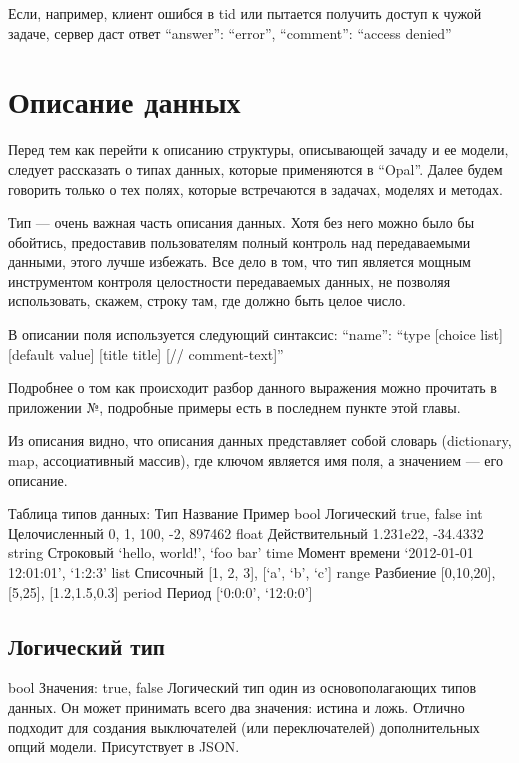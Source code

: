 {{Если, например, клиент ошибся в tid или пытается получить доступ к чужой задаче, сервер даст ответ
        {
                “answer”: “error”,
                “comment”: “access denied”
        }
        
\section{Описание данных}

Перед тем как перейти к описанию структуры, описывающей зачаду и ее модели, следует рассказать о типах данных, которые применяются в “Opal”. Далее будем говорить только о тех полях, которые встречаются в задачах, моделях и методах.

Тип — очень важная часть описания данных. Хотя без него можно было бы обойтись, предоставив пользователям полный контроль над передаваемыми данными, этого лучше избежать. Все дело в том, что тип является мощным инструментом контроля целостности передаваемых данных, не позволяя использовать, скажем, строку там, где должно быть целое число.

В описании поля используется следующий синтаксис:
        “name”: “type [choice list] [default value] [title title]
[// comment-text]”

Подробнее о том как происходит разбор данного выражения можно прочитать в приложении №, подробные примеры есть в последнем пункте этой главы.

Из описания видно, что описания данных представляет собой словарь (dictionary, map, ассоциативный массив), где ключом является имя поля, а значением — его описание.

Таблица типов данных:
Тип
	Название
	Пример
	bool
	Логический
	true, false
	int
	Целочисленный
	0, 1, 100, -2, 897462
	float
	Действительный
	1.231e22, -34.4332
	string
	Строковый
	‘hello, world!’, ‘foo bar’
	time
	Момент времени
	‘2012-01-01 12:01:01’, ‘1:2:3’
	list
	Списочный
	[1, 2, 3], [‘a’, ‘b’, ‘c’]
	range
	Разбиение
	[0,10,20], [5,25], [1.2,1.5,0.3]
	period
	Период
	[‘0:0:0’, ‘12:0:0’]
	
\subsection{Логический тип}
bool
Значения: true, false
Логический тип один из основополагающих типов данных. Он может принимать всего два значения: истина и ложь. Отлично подходит для создания выключателей (или переключателей) дополнительных опций модели.
Присутствует в JSON.

}}
